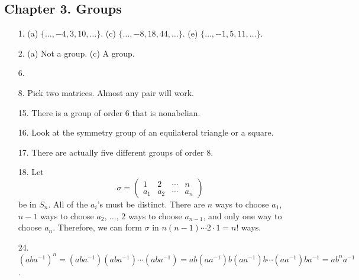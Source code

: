  
 
\subsection*{Chapter 3. Groups}
 
 
{\small
\begin{itemize}
 
\item[1.]
(a) $\{ \ldots, -4, 3, 10, \ldots \}$.
(c) $\{ \ldots, -8, 18, 44, \ldots \}$.
(e) $\{ \ldots, -1, 5, 11, \ldots \}$.
 
\item[2.]
(a) Not a group.
(c) A group.
 
 
 
\item[6.] 
 
 
\item[8.]
Pick two matrices. Almost any pair will work.
 
\item[15.]
There is a group of order 6 that is nonabelian.
 
\item[16.]
Look at the symmetry group of an equilateral triangle or a square.
 
\item[17.]
There are actually five different groups of order 8.
 
\item[18.]
Let
\[
\sigma
=
\begin{pmatrix}
1   & 2   & \cdots & n \\
a_1 & a_2 & \cdots & a_n
\end{pmatrix}
\]
be in $S_n$. All of the $a_i$'s must be distinct.  There are $n$ ways
to choose $a_1$, $n-1$ ways to choose $a_2$, $\ldots$, 2 ways to
choose $a_{n-1}$, and only one way to choose $a_n$. Therefore, we can form
$\sigma$ in $n(n-1) \cdots 2 \cdot 1 = n!$ ways.
 
\item[24.]
$(aba^{-1})^n = (aba^{-1})(aba^{-1}) \cdots (aba^{-1}) 
= ab(aa^{-1})b(aa^{-1})b \cdots (aa^{-1})ba^{-1} = ab^na^{-1}$.
 

\end{itemize}}
